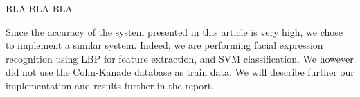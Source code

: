 \noindent BLA BLA BLA
\newline

\noindent Since the accuracy of the system presented in this article is very high, we chose to implement a similar system. Indeed, we are performing facial expression recognition using LBP for feature extraction, and SVM classification. We however did not use the Cohn-Kanade database as train data. We will describe further our implementation and results further in the report. 
\newline

